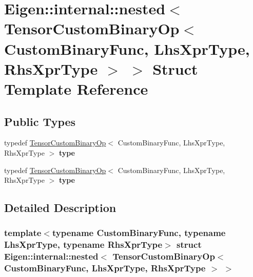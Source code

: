 \hypertarget{struct_eigen_1_1internal_1_1nested_3_01_tensor_custom_binary_op_3_01_custom_binary_func_00_01_lh0ebeaddb698d52bc5880e3a8cd1df790}{}\section{Eigen\+:\+:internal\+:\+:nested$<$ Tensor\+Custom\+Binary\+Op$<$ Custom\+Binary\+Func, Lhs\+Xpr\+Type, Rhs\+Xpr\+Type $>$ $>$ Struct Template Reference}
\label{struct_eigen_1_1internal_1_1nested_3_01_tensor_custom_binary_op_3_01_custom_binary_func_00_01_lh0ebeaddb698d52bc5880e3a8cd1df790}
\subsection*{Public Types}
\begin{DoxyCompactItemize}
\item 
\mbox{\label{struct_eigen_1_1internal_1_1nested_3_01_tensor_custom_binary_op_3_01_custom_binary_func_00_01_lh0ebeaddb698d52bc5880e3a8cd1df790_a3fe10c625cc04306c4f7484864dd5139}} 
typedef \hyperlink{class_eigen_1_1_tensor_custom_binary_op}{Tensor\+Custom\+Binary\+Op}$<$ Custom\+Binary\+Func, Lhs\+Xpr\+Type, Rhs\+Xpr\+Type $>$ {\bfseries type}
\item 
\mbox{\label{struct_eigen_1_1internal_1_1nested_3_01_tensor_custom_binary_op_3_01_custom_binary_func_00_01_lh0ebeaddb698d52bc5880e3a8cd1df790_a3fe10c625cc04306c4f7484864dd5139}} 
typedef \hyperlink{class_eigen_1_1_tensor_custom_binary_op}{Tensor\+Custom\+Binary\+Op}$<$ Custom\+Binary\+Func, Lhs\+Xpr\+Type, Rhs\+Xpr\+Type $>$ {\bfseries type}
\end{DoxyCompactItemize}


\subsection{Detailed Description}
\subsubsection*{template$<$typename Custom\+Binary\+Func, typename Lhs\+Xpr\+Type, typename Rhs\+Xpr\+Type$>$\newline
struct Eigen\+::internal\+::nested$<$ Tensor\+Custom\+Binary\+Op$<$ Custom\+Binary\+Func, Lhs\+Xpr\+Type, Rhs\+Xpr\+Type $>$ $>$}



